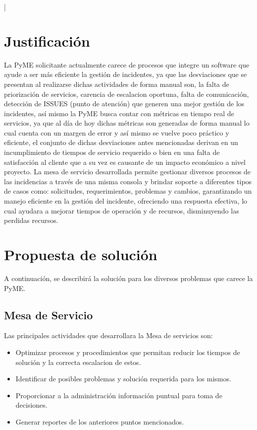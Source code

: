 |	
\section{Justificación}


La PyME solicitante actualmente carece de procesos que integre un software que ayude a ser más eficiente la  gestión de incidentes, ya que las desviaciones que se presentan  al realizarse dichas actividades de forma manual son, la falta de priorización de servicios, carencia de escalacion  oportuna, falta de  comunicación, detección de ISSUES (punto de atención) que generen una mejor gestión de los incidentes, así mismo la PyME busca contar con métricas en tiempo real de servicios, ya que al día de hoy  dichas métricas son generadas de forma manual lo cual  cuenta con un margen de error y así mismo se vuelve poco práctico y eficiente, el conjunto de dichas desviaciones antes mencionadas derivan en un incumplimiento de tiempos de servicio requerido o bien en una falta de satisfacción al cliente que a su vez es causante de un impacto económico a nivel proyecto.
La mesa de servicio desarrollada permite gestionar diversos procesos de las incidencias a través de una misma consola y brindar soporte a diferentes tipos de casos como: solicitudes, requerimientos, problemas y cambios, garantizando un manejo eficiente en la gestión del incidente, ofreciendo una respuesta efectiva, lo cual ayudara a mejorar tiempos de operación y de recursos, disminuyendo las perdidas recursos.





\section{Propuesta de solución}

A continuación, se describirá la solución para los diversos problemas que carece la PyME.
\subsection{Mesa de Servicio}
Las principales actividades que desarrollara la Mesa de servicios son: 
\begin{itemize}
	\item 	Optimizar procesos y procedimientos que permitan reducir los tiempos de solución y la correcta escalacion de estos.
\item 	Identificar de posibles problemas y solución requerida para los mismos. 
\item 	Proporcionar a la administración información puntual para toma de decisiones.
\item 	Generar reportes de los anteriores puntos mencionados.
\end{itemize}



